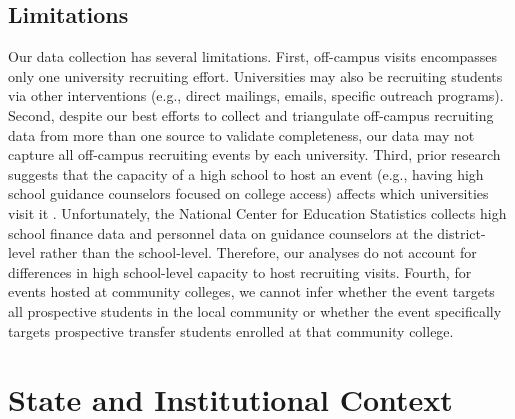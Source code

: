 \documentclass[twoside]{article}
\begin{document}
\subsection*{Limitations}

Our data collection has several limitations. First, off-campus visits encompasses only one university recruiting effort. Universities may also be recruiting students via other interventions (e.g., direct mailings, emails, specific outreach programs). Second, despite our best efforts to collect and triangulate off-campus recruiting data from more than one source to validate completeness, our data may not capture all off-campus recruiting events by each university. Third, prior research suggests that the capacity of a high school to host an event (e.g., having high school guidance counselors focused on college access) affects which universities visit it \citep{RN3519}. Unfortunately, the National Center for Education Statistics collects high school finance data and personnel data on guidance counselors at the district-level rather than the school-level. Therefore, our analyses do not account for differences in high school-level capacity to host recruiting visits.  Fourth, for events hosted at community colleges, we cannot infer whether the event targets all prospective students in the local community or whether the event specifically targets prospective transfer students enrolled at that community college.


\section*{State and Institutional Context}
\end{document}
